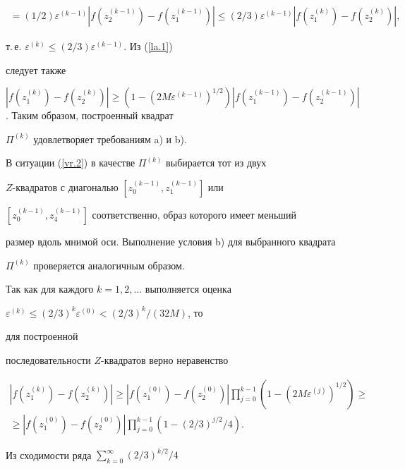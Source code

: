 \begin{pf}
\begin{multline*}
%


= (1/2)\varepsilon^{(k-1)}|f(z_2^{(k-1)}) - f(z_1^{(k-1)})| \leq 


(2/3) \varepsilon^{(k-1)}|f(z_1^{(k)}) - f(z_2^{(k)})|,


\end{multline*}


т.\,е. $\varepsilon^{(k)} \leq (2/3)\varepsilon^{(k-1)}$. Из (\ref{la.1}) 


следует также


$|f(z_1^{(k)}) - f(z_2^{(k)})| \geq (1-(2M\varepsilon^{(k-1)})^{1/2}) 


|f(z_1^{(k-1)}) - f(z_2^{(k-1)})|$. Таким образом, построенный квадрат 


$\Pi^{(k)}$ удовлетворяет требованиям a) и b).





В ситуации (\ref{vr.2}) в качестве $\Pi^{(k)}$ выбирается тот из двух 


$Z$-квадратов с диагональю $[z_0^{(k-1)}, z_1^{(k-1)}]$ или 


$[z_0^{(k-1)}, z_4^{(k-1)}]$ соответственно, образ которого имеет меньший 


размер вдоль мнимой оси. Выполнение условия b) для выбранного квадрата 


$\Pi^{(k)}$ проверяется аналогичным образом.





Так как для каждого $k=1,2,\dotsc$ выполняется оценка 


$\varepsilon^{(k)} \leq (2/3)^k \varepsilon^{(0)} < (2/3)^k /(32M)$, то 


для построенной 


последовательности $Z$-квадратов верно неравенство


\begin{multline*}


|f(z_1^{(k)}) - f(z_2^{(k)})| \geq |f(z_1^{(0)}) - f(z_2^{(0)})| 


\prod_{j=0}^{k-1} (1 - (2M\varepsilon^{(j)})^{1/2}) \geq \\


%


\geq |f(z_1^{(0)}) - f(z_2^{(0)})| \prod_{j=0}^{k-1} 


(1- (2/3)^{j/2}/4).


\end{multline*} 


Из сходимости ряда $\sum\limits_{k=0}^{\infty}(2/3)^{k/2}/4$



\end{pf}
